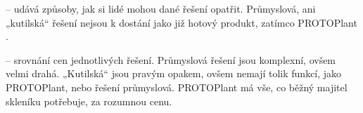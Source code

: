 \begin{table}[h]
    \centering
    \caption{Tabulka srovnání PROTOPlantu a jiných řešení.}
    \label{tab:COMPARATION}
\end{table}

\noindent{} -- udává způsoby, jak si lidé mohou dané řešení opatřit.
Průmyslová, ani „kutilská“ řešení nejsou k dostání jako již hotový produkt, zatímco PROTOPlant . \newline

\noindent{} -- srovnání cen jednotlivých řešení.
Průmyslová řešení jsou komplexní, ovšem velmi drahá.
„Kutilská“ jsou pravým opakem, ovšem nemají tolik funkcí, jako PROTOPlant, nebo řešení průmyslová.
PROTOPlant má vše, co běžný majitel skleníku potřebuje, za rozumnou cenu. \newline

